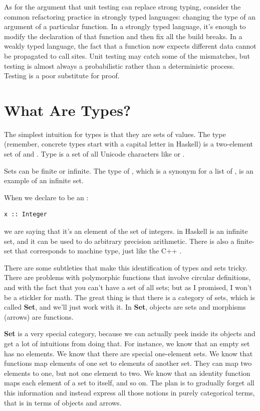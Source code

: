 As for the argument that unit testing can replace strong typing,
consider the common refactoring practice in strongly typed languages:
changing the type of an argument of a particular function. In a strongly
typed language, it's enough to modify the declaration of that function
and then fix all the build breaks. In a weakly typed language, the fact
that a function now expects different data cannot be propagated to call
sites. Unit testing may catch some of the mismatches, but testing is
almost always a probabilistic rather than a deterministic process.
Testing is a poor substitute for proof.

\section{What Are Types?}\label{what-are-types}

The simplest intuition for types is that they are sets of values. The
type  (remember, concrete types start with a capital letter
in Haskell) is a two-element set of  and .
Type  is a set of all Unicode characters like
 or .

Sets can be finite or infinite. The type of , which is a
synonym for a list of , is an example of an infinite set.

When we declare  to be an :

\begin{verbatim}
x :: Integer
\end{verbatim}
we are saying that it's an element of the set of integers.
 in Haskell is an infinite set, and it can be used to do
arbitrary precision arithmetic. There is also a finite-set 
that corresponds to machine type, just like the C++ .

There are some subtleties that make this identification of types and
sets tricky. There are problems with polymorphic functions that involve
circular definitions, and with the fact that you can't have a set of all
sets; but as I promised, I won't be a stickler for math. The great thing
is that there is a category of sets, which is called \textbf{Set}, and
we'll just work with it. In \textbf{Set}, objects are sets and morphisms
(arrows) are functions.

\textbf{Set} is a very special category, because we can actually peek
inside its objects and get a lot of intuitions from doing that. For
instance, we know that an empty set has no elements. We know that there
are special one-element sets. We know that functions map elements of one
set to elements of another set. They can map two elements to one, but
not one element to two. We know that an identity function maps each
element of a set to itself, and so on. The plan is to gradually forget
all this information and instead express all those notions in purely
categorical terms, that is in terms of objects and arrows.

